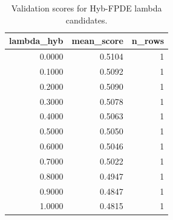 \begin{table}[t]
\caption{Validation scores for Hyb-FPDE lambda candidates.}
\label{tab:lambda_distribution_computed}
\centering
\begin{tabular}{rrr}
\toprule
lambda\_hyb & mean\_score & n\_rows \\
\midrule
0.0000 & 0.5104 & 1 \\
0.1000 & 0.5092 & 1 \\
0.2000 & 0.5090 & 1 \\
0.3000 & 0.5078 & 1 \\
0.4000 & 0.5063 & 1 \\
0.5000 & 0.5050 & 1 \\
0.6000 & 0.5046 & 1 \\
0.7000 & 0.5022 & 1 \\
0.8000 & 0.4947 & 1 \\
0.9000 & 0.4847 & 1 \\
1.0000 & 0.4815 & 1 \\
\bottomrule
\end{tabular}

\end{table}
